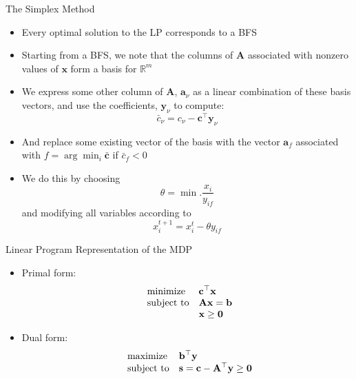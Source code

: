 \documentclass{beamer}
\renewcommand{\vec}[1]{\mathbf{#1}}
\begin{document}

\begin{frame}{The Simplex Method}
\begin{itemize}
  \item Every optimal solution to the LP corresponds to a BFS
  \item Starting from a BFS, we note that the columns of $\vec{A}$ associated with nonzero values of $\vec{x}$ form a basis for $\mathbb{R}^m$
  \item We express some other column of $\vec{A}$, $\vec{a}_{\nu}$ as a linear combination of these basis vectors, and use the coefficients, $\vec{y}_\nu$ to compute:
  $$\bar{c}_\nu = c_\nu - \vec{c}^\top\vec{y}_\nu$$
  \item And replace some existing vector of the basis with the vector $\vec{a}_f$ associated with $f = \arg\!\min_i\bar{\vec{c}}$ if $\bar{c}_f < 0$
  \item We do this by choosing $$\theta = \min. \frac{x_i}{y_{if}}$$
  and modifying all variables according to
  $$x_i^{t+1} = x_i^{t} - \theta y_{if}$$

\end{itemize}
\end{frame}


\begin{frame}{Linear Program Representation of the MDP}
\begin{itemize}[<+->]
\item Primal form:
\begin{equation*}
\begin{array}{ll@{}ll}
\text{minimize}  & \displaystyle \vec{c}^\top\vec{x}\\
\text{subject to}& \displaystyle \vec{Ax}=\vec{b}\\
                         &  \displaystyle\vec{x}\geq\vec{0}
\end{array}
\end{equation*}

\item  Dual form:
\begin{equation*}
\begin{array}{ll@{}ll}
\text{maximize}  & \displaystyle \vec{b}^\top\vec{y}\\
\text{subject to}& \displaystyle \vec{s}=\vec{c}-\vec{A}^\top\vec{y}\geq \vec{0}
\end{array}
\end{equation*}
\end{itemize}
\end{frame}
\end{document}
